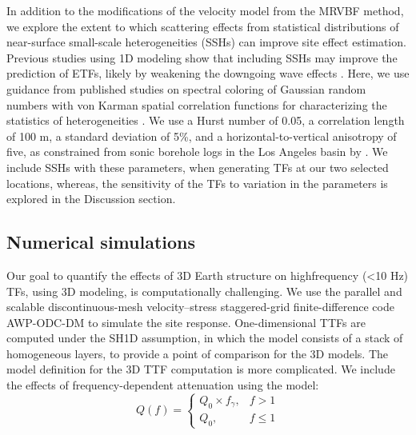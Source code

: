 In addition to the modifications of the velocity model from the MRVBF method, we explore the extent to which scattering effects from statistical distributions of near-surface small-scale heterogeneities (SSHs) can improve site effect estimation. Previous studies using 1D modeling show that including SSHs may improve the prediction of ETFs, likely by weakening the downgoing wave effects \citep{nourFiniteElementModel2003,thompsonTaxonomySiteResponse2012}. Here, we use guidance from published studies on spectral coloring of Gaussian random numbers with von Karman spatial correlation functions for characterizing the statistics of heterogeneities \citep[see \cref{app:A}; as well as, e.g.,][]{frankelFiniteDifferenceSimulations1986,withersGroundMotionIntraevent2019}. We use a Hurst number of 0.05, a correlation length of 100 m, a standard deviation of 5\%, and a horizontal-to-vertical anisotropy of five, as constrained from sonic borehole logs in the Los Angeles basin by \citet{savranModelSmallscaleCrustal2016}. We include SSHs with these parameters, when generating TFs at our two selected locations, whereas, the sensitivity of the TFs to variation in the parameters is explored in the Discussion section.

\subsection{Numerical simulations}
Our goal to quantify the effects of 3D Earth structure on highfrequency (<10 Hz) TFs, using 3D modeling, is computationally challenging. We use the parallel and scalable discontinuous-mesh velocity–stress staggered-grid finite-difference code AWP-ODC-DM \citep{olsenSimulationThreeDimensional1994,cuiScalableEarthquakeSimulation2010,nieFourthOrderStaggered2017} to simulate the site response. One-dimensional TTFs are computed under the SH1D assumption, in which the model consists of a stack of homogeneous layers, to provide a point of comparison for the 3D models. The model definition for the 3D TTF computation is more complicated. We include the effects of frequency-dependent attenuation using the model:
\begin{equation}
  Q(f) =
  \begin{cases}
    Q_0 \times f_\gamma, & f > 1   \\
    Q_0,                 & f \le 1
    \label{eq:etf-4}
  \end{cases}
\end{equation}

